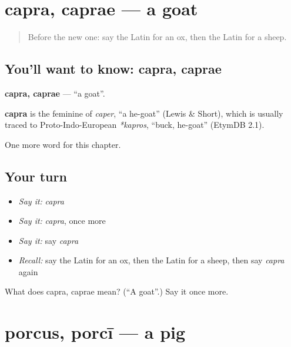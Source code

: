 \section[capra, caprae]{capra, caprae — a goat}

\label{lesson:LA-C90-capra}



\begin{quote}
Before the new one: say the Latin for an ox, then the Latin for a sheep.
\end{quote}

\subsection*{You'll want to know: capra, caprae}
\textbf{capra, caprae} — \textquotedblleft{}a goat\textquotedblright{}.

\begin{cousinweb}
\textbf{capra} is the feminine of \emph{caper}, \textquotedblleft{}a he-goat\textquotedblright{} (Lewis \& Short), which is usually traced to Proto-Indo-European \emph{*kapros}, \textquotedblleft{}buck, he-goat\textquotedblright{} (EtymDB 2.1).
\end{cousinweb}

\begin{grammarlens}[title={What you've built}]
One more word for this chapter.
\end{grammarlens}

\subsection*{Your turn}
\begin{itemize}
\raggedright
  \item \emph{Say it:} \emph{capra}
  \item \emph{Say it:} \emph{capra}, once more
  \item \emph{Say it:} say \emph{capra}
  \item \emph{Recall:} say the Latin for an ox, then the Latin for a sheep, then say \emph{capra} again
\end{itemize}

\begin{tcolorbox}[breakable,colback=teal!4,colframe=teal!35!black,title={Before you move on}]
What does capra, caprae mean? (\textquotedblleft{}A goat\textquotedblright{}.) Say it once more.
\end{tcolorbox}
\section[porcus, porcī]{porcus, porcī — a pig}

